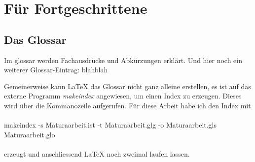 \documentclass[a4paper,11pt]{report}
\begin{document}
\chapter{Für Fortgeschrittene}
\section{Das Glossar}
Im \gls{glossar} werden Fachausdrücke und Abkürzungen erklärt. Und hier noch ein weiterer Glossar-Eintrag: \gls{blahblah}

Gemeinerweise kann \LaTeX{} das Glossar nicht ganz alleine erstellen, es ist auf das externe Programm \emph{makeindex} angewiesen, um einen Index zu erzeugen. Dieses wird über die Kommanozeile aufgerufen. Für diese Arbeit habe ich den Index mit
\\ \\
makeindex -s Maturaarbeit.ist -t Maturaarbeit.glg -o Maturaarbeit.gls Maturaarbeit.glo
\\ \\
erzeugt und anschliessend \LaTeX{} noch zweimal laufen lassen.

\printglossary[nonumberlist,title=Glossar]
\end{document}
